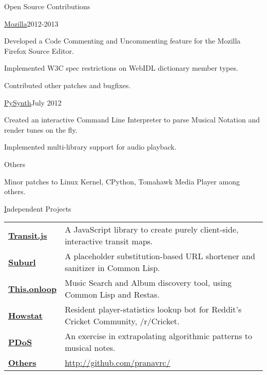 \documentclass{gradresume} %
\begin{document}
\begin{rSection}{Open Source Contributions}

\begin{rSubsection}{\href{https://bugzilla.mozilla.org/user\%5Fprofile?user\%5Fid=431664}{Mozilla}}{2012-2013}{}{}
\item Developed a Code Commenting and Uncommenting feature for the Mozilla Firefox Source Editor.
\item Implemented W3C spec restrictions on WebIDL dictionary member types.
\item Contributed other patches and bugfixes.
\end{rSubsection}

\begin{rSubsection}{\href{https://github.com/mdoege/PySynth/commits?author=pranavrc}{PySynth}}{July 2012}{}{}
\item Created an interactive Command Line Interpreter to parse Musical Notation and render tunes on the fly.
\item Implemented multi-library support for audio playback.
\end{rSubsection}

\begin{rSubsection}{Others}{}{}{}
\item Minor patches to Linux Kernel, CPython, Tomahawk Media Player among others.
\end{rSubsection}

\end{rSection}


\begin{rSection}{{\href{http://github.com/pranavrc/}Independent Projects}}

\begin{tabular}{ @{} >{\bfseries}l @{\hspace{6ex}} l }
\href{http://onloop.net/transit/}{Transit.js} & A JavaScript library to create purely client-side, interactive transit maps. \\
\href{http://u.onloop.net/}{Suburl} & A placeholder substitution-based URL shortener and sanitizer in Common Lisp. \\
\href{http://this.onloop.net/}{This.onloop} & Music Search and Album discovery tool, using Common Lisp and Restas. \\
\href{http://redd.it/1i7lh3}{Howstat} & Resident player-statistics lookup bot for Reddit's Cricket Community, /r/Cricket. \\
\href{http://music.onloop.net}{PDoS} & An exercise in extrapolating algorithmic patterns to musical notes. \\
\href{http://github.com/pranavrc/}{Others} & \href{http://github.com/pranavrc/}{http://github.com/pranavrc/}
\end{tabular}

\end{rSection}
\end{document}
